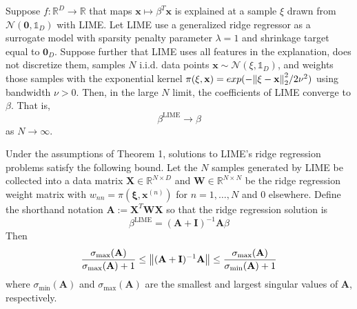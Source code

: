 \documentclass[mnsc,blindrev]{informs3}
\begin{document}
            \begin{theorem}
                \label{thm:lime_thm}
                Suppose $f:\mathbb{R}^D\rightarrow \mathbb{R}$ that maps $\mathbf{x} \mapsto \beta^T \mathbf{x}$ is explained at a sample $\xi$ drawn from $\mathcal{N}(\mathbf{0}, \mathds{1}_D)$ with LIME. Let LIME use a generalized ridge regressor as a surrogate model with sparsity penalty parameter $\lambda=1$ and shrinkage target equal to $\mathbf{0}_D$. Suppose further that LIME uses all features in the explanation, does not discretize them, samples $N$ i.i.d. data points $\mathbf{x} \sim \mathcal{N}(\xi, \mathds{1}_D)$, and weights those samples with the exponential kernel $\pi(\mathbf{\xi},\mathbf{x}) = exp(-\norm{\mathbf{\xi}-\mathbf{x}}_2^2/2\nu^2)$ using bandwidth $\nu>0$. Then, in the large $N$ limit, the coefficients of LIME converge to $\beta$. That is,
                \begin{equation*}
                    \beta^{\text{LIME}} \rightarrow \beta
                \end{equation*}
                as $N \rightarrow \infty$.
            \end{theorem}

            \begin{proposition}
                Under the assumptions of Theorem 1, solutions to LIME's ridge regression problems satisfy the following bound. Let the $N$ samples generated by LIME be collected into a data matrix $\mathbf{X}\in\mathbb{R}^{N\times D}$ and $\mathbf{W}\in\mathbb{R}^{N\times N}$ be the ridge regression weight matrix with $w_{nn} = \pi(\mathbf{\xi},\mathbf{x}^{(n)})$ for $n=1,\ldots,N$ and 0 elsewhere. Define the shorthand notation $\mathbf{A}:= \mathbf{X}^T \mathbf{W}\mathbf{X}$ so that the ridge regression solution is
                \begin{equation*}
                    \beta^{\text{LIME}} = (\mathbf{A} + \mathbf{I})^{-1}\mathbf{A} \beta
                \end{equation*}
                Then
                \begin{equation*}
                    \frac{\sigma_{\max}(\mathbf{A})}{\sigma_{\max}(\mathbf{A}) + 1} \leq \norm{(\mathbf{A} + \mathbf{I})^{-1}\mathbf{A}} \leq \frac{\sigma_{\max}(\mathbf{A})}{\sigma_{\min}(\mathbf{A}) + 1}
                \end{equation*}
                where $\sigma_{\min}(\mathbf{A})$ and $\sigma_{\max}(\mathbf{A})$ are the smallest and largest singular values of $\mathbf{A}$, respectively. 
            \end{proposition}
        
\end{document}
